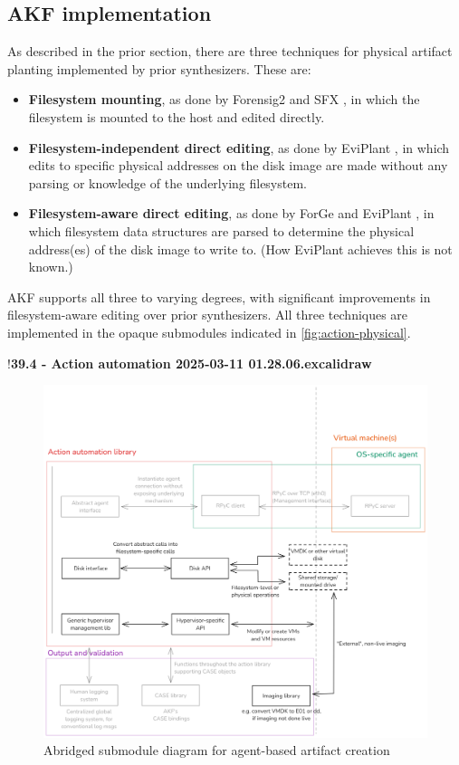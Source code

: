 \documentclass[letterpaper,12pt]{report}
\def\tightlist{}
\begin{document}
\subsection{AKF implementation}\label{akf-implementation}

As described in the prior section, there are three techniques for
physical artifact planting implemented by prior synthesizers. These are:

\begin{itemize}
\tightlist
\item
  \textbf{Filesystem mounting}, as done by Forensig2
  \cite{mochForensicImageGenerator2009} and SFX
  \cite{russellForensicImageDescription2012}, in which the
  filesystem is mounted to the host and edited directly.
\item
  \textbf{Filesystem-independent direct editing}, as done by EviPlant
  \cite{scanlonEviPlantEfficientDigital2017}, in which edits to
  specific physical addresses on the disk image are made without any
  parsing or knowledge of the underlying filesystem.
\item
  \textbf{Filesystem-aware direct editing}, as done by ForGe
  \cite{vistiAutomaticCreationComputer2015} and EviPlant
  \cite{scanlonEviPlantEfficientDigital2017}, in which filesystem
  data structures are parsed to determine the physical address(es) of
  the disk image to write to. (How EviPlant achieves this is not known.)
\end{itemize}

AKF supports all three to varying degrees, with significant improvements
in filesystem-aware editing over prior synthesizers. All three
techniques are implemented in the opaque submodules indicated in
\autoref{fig:action-physical}.

!\textbf{39.4 - Action automation 2025-03-11 01.28.06.excalidraw}

\begin{figure}[h]
\centering
\includegraphics[width=1\linewidth]{action-physical.png}
\caption{Abridged submodule diagram for agent-based artifact
creation}\label{fig:action-physical}
\end{figure}
\end{document}
